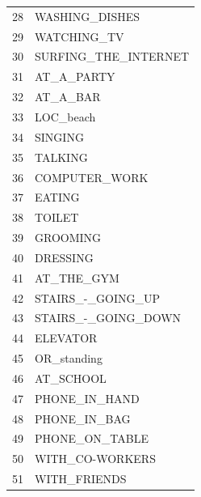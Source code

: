 \documentclass{UoNMCHA}
\numberwithin{equation}{section}
\begin{document}
\begin{table}[h]
\begin{center}
\begin{tabular}{ll}
28 & WASHING\_DISHES              \\
29 & WATCHING\_TV                 \\
30 & SURFING\_THE\_INTERNET       \\
31 & AT\_A\_PARTY                 \\
32 & AT\_A\_BAR                   \\
33 & LOC\_beach                   \\
34 & SINGING                      \\
35 & TALKING                      \\
36 & COMPUTER\_WORK               \\
37 & EATING                       \\
38 & TOILET                       \\
39 & GROOMING                     \\
40 & DRESSING                     \\
41 & AT\_THE\_GYM                 \\
42 & STAIRS\_-\_GOING\_UP         \\
43 & STAIRS\_-\_GOING\_DOWN       \\
44 & ELEVATOR                     \\
45 & OR\_standing                 \\
46 & AT\_SCHOOL                   \\
47 & PHONE\_IN\_HAND              \\
48 & PHONE\_IN\_BAG               \\
49 & PHONE\_ON\_TABLE             \\
50 & WITH\_CO-WORKERS             \\
51 & WITH\_FRIENDS                \\ \hline 
\end{tabular}    
\end{center}
\end{table}






\end{document}
